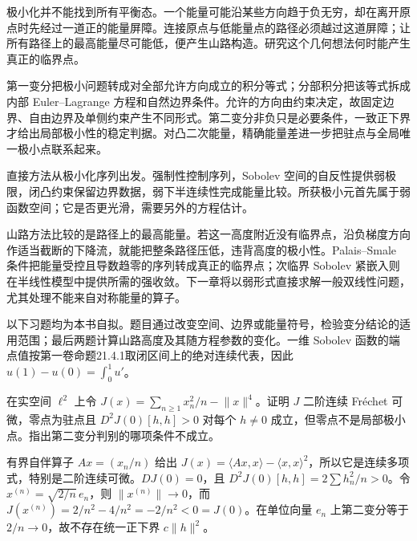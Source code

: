 \ProseParagraphBreak

极小化并不能找到所有平衡态。一个能量可能沿某些方向趋于负无穷，却在离开原点时先经过一道正的能量屏障。连接原点与低能量点的路径必须越过这道屏障；让所有路径上的最高能量尽可能低，便产生山路构造。研究这个几何想法何时能产生真正的临界点。






\begin{chaptersummary}
第一变分把极小问题转成对全部允许方向成立的积分等式；分部积分把该等式拆成内部 Euler--Lagrange 方程和自然边界条件。允许的方向由约束决定，故固定边界、自由边界及单侧约束产生不同形式。第二变分非负只是必要条件，一致正下界才给出局部极小性的稳定判据。对凸二次能量，精确能量差进一步把驻点与全局唯一极小点联系起来。

\ProseParagraphBreak

直接方法从极小化序列出发。强制性控制序列，Sobolev 空间的自反性提供弱极限，闭凸约束保留边界数据，弱下半连续性完成能量比较。所获极小元首先属于弱函数空间；它是否更光滑，需要另外的方程估计。

\ProseParagraphBreak

山路方法比较的是路径上的最高能量。若这一高度附近没有临界点，沿负梯度方向作适当截断的下降流，就能把整条路径压低，违背高度的极小性。Palais--Smale 条件把能量受控且导数趋零的序列转成真正的临界点；次临界 Sobolev 紧嵌入则在半线性模型中提供所需的强收敛。下一章将以弱形式直接求解一般双线性问题，尤其处理不能来自对称能量的算子。
\end{chaptersummary}


\BookExercises

以下习题均为本书自拟。题目通过改变空间、边界或能量符号，检验变分结论的适用范围；最后两题计算山路高度及其随方程参数的变化。一维 Sobolev 函数的端点值按第一卷命题21.4.1取闭区间上的绝对连续代表，因此 \(u(1)-u(0)=\int_0^1u'\)。

\begin{exercise}\label{b2:ex:14-positive-hessian}
在实空间 \(\ell^2\) 上令 \(J(x)=\sum_{n\ge1}x_n^2/n-\lVert x\rVert^4\)。证明 \(J\) 二阶连续 Fréchet 可微，零点为驻点且 \(D^2J(0)[h,h]>0\) 对每个 \(h\ne0\) 成立，但零点不是局部极小点。指出第二变分判别的哪项条件不成立。
\end{exercise}
\begin{solution}
有界自伴算子 \(Ax=(x_n/n)\) 给出 \(J(x)=\langle Ax,x\rangle-\langle x,x\rangle^2\)，所以它是连续多项式，特别是二阶连续可微。\(DJ(0)=0\)，且 \(D^2J(0)[h,h]=2\sum h_n^2/n>0\)。令 \(x^{(n)}=\sqrt{2/n}\,e_n\)，则 \(\lVert x^{(n)}\rVert\to0\)，而 \(J(x^{(n)})=2/n^2-4/n^2=-2/n^2<0=J(0)\)。在单位向量 \(e_n\) 上第二变分等于 \(2/n\to0\)，故不存在统一正下界 \(c\lVert h\rVert^2\)。
\end{solution}

